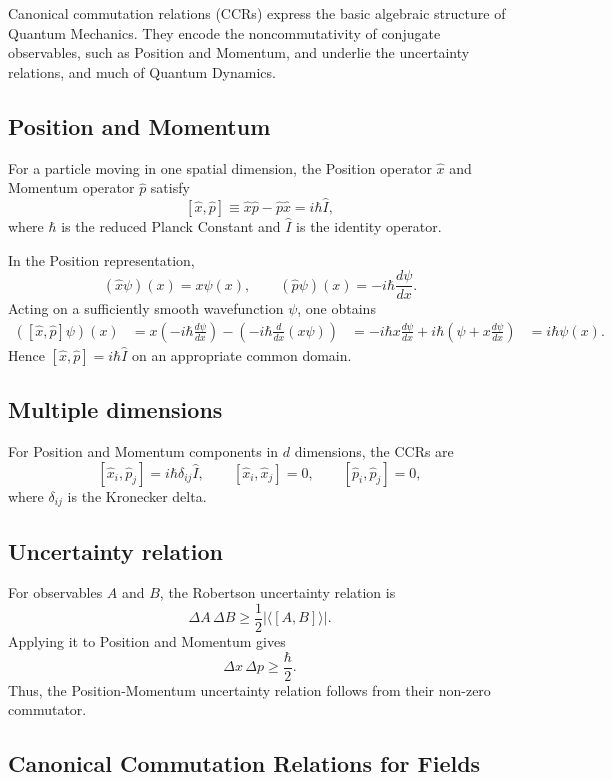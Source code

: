 \documentclass[a4paper, 10pt, onepage]{elegantbook}
\begin{document}
{Canonical commutation relations (CCRs) express the basic algebraic structure of Quantum Mechanics. They encode the 
noncommutativity of conjugate observables, such as Position and Momentum, and underlie the uncertainty relations, and 
much of Quantum Dynamics.

\subsection{Position and Momentum}

For a particle moving in one spatial dimension, the Position operator
\(\hat{x}\) and Momentum operator \(\hat{p}\) satisfy
\[
[\hat{x},\hat{p}]
\equiv \hat{x}\hat{p}-\hat{p}\hat{x}
=i\hbar \hat{I},
\]
where \(\hbar\) is the reduced Planck Constant and \(\hat{I}\) is the
identity operator.

In the Position representation,
\[
(\hat{x}\psi)(x)=x\psi(x),
\qquad
(\hat{p}\psi)(x)=-i\hbar\frac{d\psi}{dx}.
\]
Acting on a sufficiently smooth wavefunction \(\psi\), one obtains
\begin{align*}
([\hat{x},\hat{p}]\psi)(x)
&=x\left(-i\hbar\frac{d\psi}{dx}\right)
  -\left(-i\hbar\frac{d}{dx}(x\psi)\right)
&=-i\hbar x\frac{d\psi}{dx}
  +i\hbar\left(\psi+x\frac{d\psi}{dx}\right)
&=i\hbar\psi(x).
\end{align*}
Hence \([\hat{x},\hat{p}]=i\hbar\hat{I}\) on an appropriate common domain.

\subsection{Multiple dimensions}

For Position and Momentum components in \(d\) dimensions, the CCRs are
\[
[\hat{x}_i,\hat{p}_j]=i\hbar\delta_{ij}\hat{I},
\qquad
[\hat{x}_i,\hat{x}_j]=0,
\qquad
[\hat{p}_i,\hat{p}_j]=0,
\]
where \(\delta_{ij}\) is the Kronecker delta.

\subsection{Uncertainty relation}

For observables \(A\) and \(B\), the Robertson uncertainty relation is
\[
\Delta A\,\Delta B
\geq \frac{1}{2}\left|\langle[A,B]\rangle\right|.
\]
Applying it to Position and Momentum gives
\[
\Delta x\,\Delta p\geq\frac{\hbar}{2}.
\]
Thus, the Position-Momentum uncertainty relation follows from their non-zero commutator.

\subsection{Canonical Commutation Relations for Fields}

}
\end{document}

